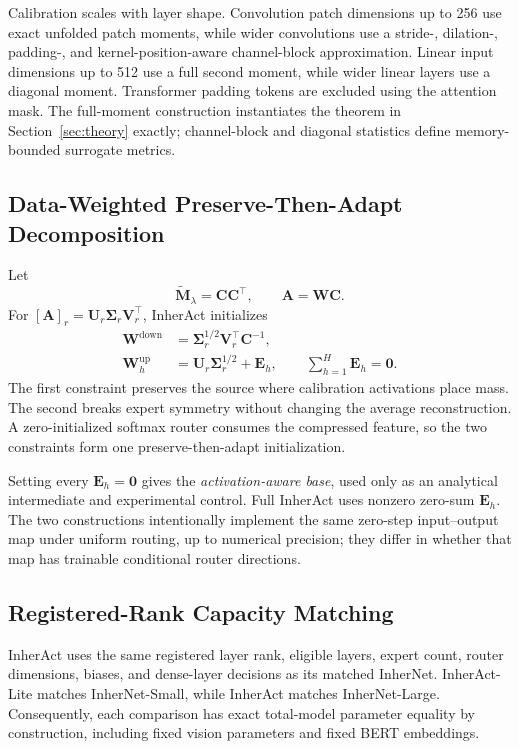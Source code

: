 \documentclass{article}
\newcommand{\bW}{\mathbf{W}}
\newcommand{\bM}{\mathbf{M}}
\newcommand{\bC}{\mathbf{C}}
\newcommand{\bA}{\mathbf{A}}
\newcommand{\bE}{\mathbf{E}}
\newcommand{\bU}{\mathbf{U}}
\newcommand{\bV}{\mathbf{V}}
\newcommand{\bSigma}{\mathbf{\Sigma}}
\begin{document}
Calibration scales with layer shape.  Convolution patch dimensions up to 256
use exact unfolded patch moments, while wider convolutions use a stride-,
dilation-, padding-, and kernel-position-aware channel-block approximation.
Linear input dimensions up to 512 use a full second moment, while wider linear
layers use a diagonal moment.  Transformer padding tokens are excluded using
the attention mask.  The full-moment construction instantiates the theorem in
Section~\ref{sec:theory} exactly; channel-block and diagonal statistics define
memory-bounded surrogate metrics.

\subsection{Data-Weighted Preserve-Then-Adapt Decomposition}

Let
\begin{equation}
  \widetilde{\bM}_\lambda=\bC\bC^\top,
  \qquad \bA=\bW\bC.
  \label{eq:weighted-operator}
\end{equation}
For $[\bA]_r=\bU_r\bSigma_r\bV_r^\top$, InherAct initializes
\begin{align}
  \bW^{\mathrm{down}}
    &=\bSigma_r^{1/2}\bV_r^\top\bC^{-1},
    \label{eq:inheract-down}\\
  \bW_h^{\mathrm{up}}
    &=\bU_r\bSigma_r^{1/2}+\bE_h,
    \qquad \sum_{h=1}^{H}\bE_h=\mathbf{0}.
    \label{eq:inheract-up}
\end{align}
The first constraint preserves the source where calibration activations place
mass.  The second breaks expert symmetry without changing the average
reconstruction.  A zero-initialized softmax router consumes the compressed
feature, so the two constraints form one preserve-then-adapt initialization.

Setting every $\bE_h=\mathbf{0}$ gives the \emph{activation-aware base}, used
only as an analytical intermediate and experimental control.  Full InherAct uses
nonzero zero-sum $\bE_h$.  The two constructions intentionally implement the
same zero-step input--output map under uniform routing, up to numerical
precision; they differ in whether that map has trainable conditional router
directions.

\subsection{Registered-Rank Capacity Matching}

InherAct uses the same registered layer rank, eligible layers, expert count,
router dimensions, biases, and dense-layer decisions as its matched InherNet.
InherAct-Lite matches InherNet-Small, while InherAct matches InherNet-Large.
Consequently, each comparison has exact total-model parameter equality by
construction, including fixed vision parameters and fixed BERT embeddings.
\end{document}
